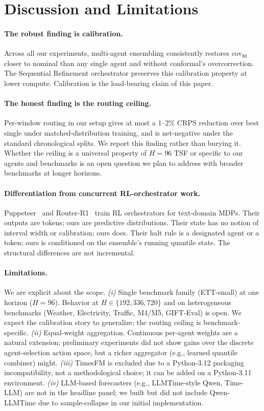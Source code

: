 \documentclass{article}
\begin{document}
\section{Discussion and Limitations}
\label{sec:discussion}

\paragraph{The robust finding is calibration.}
Across all our experiments, multi-agent ensembling consistently
restores cov$_{80}$ closer to nominal than any single agent and
without conformal's overcorrection. The Sequential Refinement
orchestrator preserves this calibration property at lower compute.
Calibration is the load-bearing claim of this paper.

\paragraph{The honest finding is the routing ceiling.}
Per-window routing in our setup gives at most a $1$--$2\%$ CRPS
reduction over best single under matched-distribution training,
and is net-negative under the standard chronological splits. We
report this finding rather than burying it. Whether the ceiling
is a universal property of $H=96$ TSF or specific to our agents
and benchmarks is an open question we plan to address with broader
benchmarks at longer horizons.

\paragraph{Differentiation from concurrent RL-orchestrator work.}
Puppeteer~\cite{wei2025puppeteer} and Router-R1~\cite{tang2025routerr1}
train RL orchestrators for text-domain MDPs. Their outputs are
tokens; ours are predictive distributions. Their state has no
notion of interval width or calibration; ours does. Their halt
rule is a designated agent or a token; ours is conditioned on the
ensemble's running quantile state. The structural differences are
not incremental.

\paragraph{Limitations.}
We are explicit about the scope.
\emph{(i)} Single benchmark family (ETT-small) at one horizon ($H=96$).
Behavior at $H \in \{192, 336, 720\}$ and on heterogeneous benchmarks
(Weather, Electricity, Traffic, M4/M5, GIFT-Eval) is open. We expect
the calibration story to generalize; the routing ceiling is
benchmark-specific.
\emph{(ii)} Equal-weight aggregation. Continuous per-agent weights are
a natural extension; preliminary experiments did not show gains over
the discrete agent-selection action space, but a richer aggregator
(e.g., learned quantile combiner) might.
\emph{(iii)} TimesFM is excluded due to a Python-3.12 packaging
incompatibility, not a methodological choice; it can be added on a
Python-3.11 environment.
\emph{(iv)} LLM-based forecasters (e.g., LLMTime-style Qwen, Time-LLM)
are not in the headline panel; we built but did not include
Qwen-LLMTime due to sample-collapse in our initial implementation.
\end{document}
